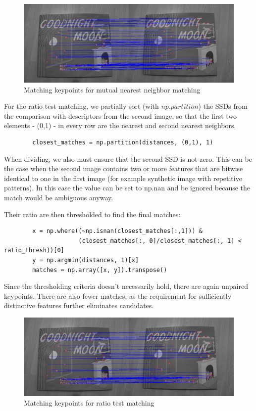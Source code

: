 \documentclass[10pt,a4paper,twoside]{article}
\begin{document}
\begin{figure}[H]
    \includegraphics[width=\textwidth]{match_mutual.png}
    \centering
    \caption{Matching keypoints for mutual nearest neighbor matching}
    \label{match_mutual}
\end{figure}

For the ratio test matching, we partially sort (with $np.partition$) the SSDs from
the comparison with descriptors from the second image, so that the first two
elements - (0,1) - in every row are the nearest and second nearest neighbors. 

\begin{verbatim}
        closest_matches = np.partition(distances, (0,1), 1)
\end{verbatim}
When
dividing, we also must ensure that the second SSD is not zero. This can be the
case when the second image contains two or more features that are bitwise
identical to one in the first image (for example synthetic image with repetitive
patterns). In this case the value can be set to np.nan and be ignored
because the match would be ambiguous anyway.

Their ratio are then thresholded to find the final matches:
\begin{verbatim}
        x = np.where((~np.isnan(closest_matches[:,1])) & 
                     (closest_matches[:, 0]/closest_matches[:, 1] < ratio_thresh))[0]
        y = np.argmin(distances, 1)[x]
        matches = np.array([x, y]).transpose()
\end{verbatim}

Since the thresholding criteria doesn't necessarily hold, there are again
unpaired keypoints. There are also fewer matches, as the requirement for
sufficiently distinctive features further eliminates candidates.

\begin{figure}[H]
    \includegraphics[width=\textwidth]{match_ratio.png}
    \centering
    \caption{Matching keypoints for ratio test matching}
    \label{match_ratio}
\end{figure}
\end{document}
